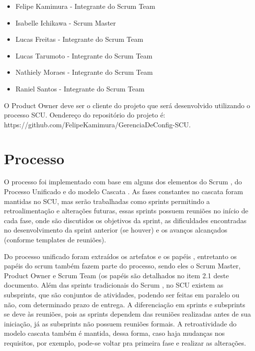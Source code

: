 \documentclass[	DIV=calc,%
							paper=a4,%
							fontsize=12pt,%
							onecolumn]{scrartcl}%
\begin{document}
\begin{itemize}
	\item Felipe Kamimura - Integrante do Scrum Team
	\item Isabelle Ichikawa - Scrum Master
	\item Lucas Freitas - Integrante do Scrum Team
	\item Lucas Tarumoto - Integrante do Scrum Team
	\item Nathiely Moraes - Integrante do Scrum Team
    \item Raniel Santos - Integrante do Scrum Team
\end{itemize}

O Product Owner deve ser o cliente do projeto que será desenvolvido utilizando o processo SCU. Oendereço do repositório do projeto é: \\
https://github.com/FelipeKamimura/GerenciaDeConfig-SCU.


\section{Processo}

O processo foi implementado com base em alguns dos elementos do Scrum \cite{sutherland2014scrum}, do Processo Unificado \cite{scott2003processo} e do modelo Cascata \cite{sommervilleengenharia}. As fases constantes no cascata \cite{sommervilleengenharia} foram mantidas no SCU, mas serão trabalhadas como sprints permitindo a retroalimentação e alterações futuras, essas sprints possuem reuniões no início de cada fase, onde são discutidos os objetivos da sprint, as dificuldades encontradas no desenvolvimento da sprint anterior (se houver) e os avanços alcançados (conforme templates de reuniões).

Do processo unificado foram extraídos os artefatos e os papéis \cite{scott2003processo}, entretanto os papéis do scrum \cite{sutherland2014scrum}também fazem parte do processo, sendo eles o Scrum Master, Product Owner e Scrum Team \cite{sutherland2014scrum} (os papéis são detalhados no item 2.1 deste documento. Além das sprints tradicionais do Scrum \cite{sutherland2014scrum}, no SCU existem as subsprints, que são conjuntos de atividades, podendo ser feitas em paralelo ou não, com determinado prazo de entrega. A diferenciação em sprints e subsprints se deve às reuniões, pois as sprints dependem das reuniões realizadas antes de sua iniciação, já as subsprints não possuem reuniões formais. A retroatividade do modelo cascata também é mantida, dessa forma, caso haja mudanças nos requisitos, por exemplo, pode-se voltar pra primeira fase e realizar as alterações.
\end{document}
